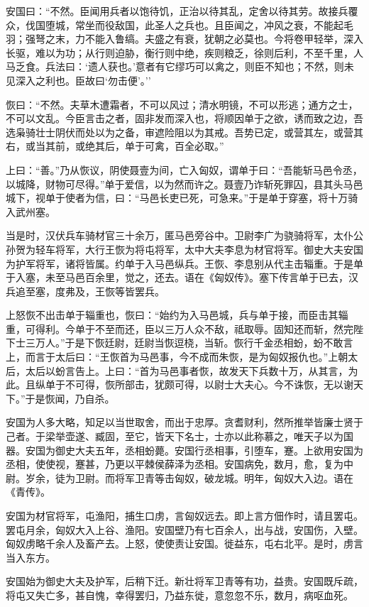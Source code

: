\documentclass[]{article}
\begin{document}
安国曰：``不然。臣闻用兵者以饱待饥，正治以待其乱，定舍以待其劳。故接兵覆众，伐国堕城，常坐而役敌国，此圣人之兵也。且臣闻之，冲风之衰，不能起毛羽；强弩之末，力不能入鲁缟。夫盛之有衰，犹朝之必莫也。今将卷甲轻举，深入长驱，难以为功；从行则迫胁，衡行则中绝，疾则粮乏，徐则后利，不至千里，人马乏食。兵法曰：`遗人获也。'意者有它缪巧可以禽之，则臣不知也；不然，则未见深入之利也。臣故曰`勿击便'。''

恢曰：``不然。夫草木遭霜者，不可以风过；清水明镜，不可以形逃；通方之士，不可以文乱。今臣言击之者，固非发而深入也，将顺因单于之欲，诱而致之边，吾选枭骑壮士阴伏而处以为之备，审遮险阻以为其戒。吾势已定，或营其左，或营其右，或当其前，或绝其后，单于可禽，百全必取。''

上曰：``善。''乃从恢议，阴使聂壹为间，亡入匈奴，谓单于曰：``吾能斩马邑令丞，以城降，财物可尽得。''单于爱信，以为然而许之。聂壹乃诈斩死罪囚，县其头马邑城下，视单于使者为信，曰：``马邑长吏已死，可急来。''于是单于穿塞，将十万骑入武州塞。

当是时，汉伏兵车骑材官三十余万，匿马邑旁谷中。卫尉李广为骁骑将军，太仆公孙贺为轻车将军，大行王恢为将屯将军，太中大夫李息为材官将军。御史大夫安国为护军将军，诸将皆属。约单于入马邑纵兵。王恢、李息别从代主击辎重。于是单于入塞，未至马邑百余里，觉之，还去。语在《匈奴传》。塞下传言单于已去，汉兵追至塞，度弗及，王恢等皆罢兵。

上怒恢不出击单于辎重也，恢曰：``始约为入马邑城，兵与单于接，而臣击其辎重，可得利。今单于不至而还，臣以三万人众不敌，祗取辱。固知还而斩，然完陛下士三万人。''于是下恢廷尉，廷尉当恢逗桡，当斩。恢行千金丞相蚡，蚡不敢言上，而言于太后曰：``王恢首为马邑事，今不成而朱恢，是为匈奴报仇也。''上朝太后，太后以蚡言告上。上曰：``首为马邑事者恢，故发天下兵数十万，从其言，为此。且纵单于不可得，恢所部击，犹颇可得，以尉士大夫心。今不诛恢，无以谢天下。''于是恢闻，乃自杀。

安国为人多大略，知足以当世取舍，而出于忠厚。贪耆财利，然所推举皆廉士贤于己者。于梁举壶遂、臧固，至它，皆天下名士，士亦以此称慕之，唯天子以为国器。安国为御史大夫五年，丞相蚡薨。安国行丞相事，引堕车，蹇。上欲用安国为丞相，使使视，蹇甚，乃更以平棘侯薛泽为丞相。安国病免，数月，愈，复为中尉。岁余，徒为卫尉。而将军卫青等击匈奴，破龙城。明年，匈奴大入边。语在《青传》。

安国为材官将军，屯渔阳，捕生口虏，言匈奴远去。即上言方佃作时，请且罢屯。罢屯月余，匈奴大入上谷、渔阳。安国壁乃有七百余人，出与战，安国伤，入壁。匈奴虏略千余人及畜产去。上怒，使使责让安国。徙益东，屯右北平。是时，虏言当入东方。

安国始为御史大夫及护军，后稍下迁。新壮将军卫青等有功，益贵。安国既斥疏，将屯又失亡多，甚自愧，幸得罢归，乃益东徙，意忽忽不乐，数月，病呕血死。
\end{document}
